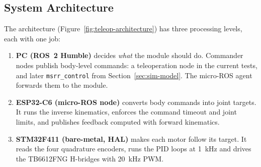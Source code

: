 \documentclass[12pt,a4paper]{article}
\begin{document}
\subsection{System Architecture}

The architecture (Figure~\ref{fig:teleop-architecture}) has three processing levels,
each with one job:

\begin{enumerate}
  \item \textbf{PC (ROS~2 Humble)} decides \emph{what} the module should do. Commander
        nodes publish body-level commands: a teleoperation node in the current tests, and
        later \texttt{msrr\_control} from Section~\ref{sec:sim-model}. The micro-ROS agent forwards them to the module.
  \item \textbf{ESP32-C6 (micro-ROS node)} converts body commands into joint targets.
        It runs the inverse kinematics, enforces the command timeout and joint limits,
        and publishes feedback computed with forward kinematics.
  \item \textbf{STM32F411 (bare-metal, HAL)} makes each motor follow its target. It
        reads the four quadrature encoders, runs the PID loops at \SI{1}{kHz} and
        drives the TB6612FNG H-bridges with \SI{20}{kHz} PWM.
\end{enumerate}
\end{document}
